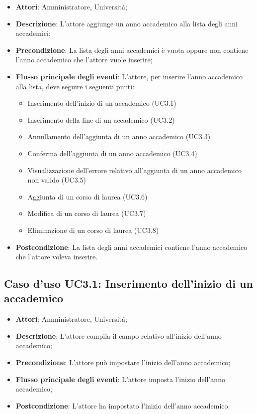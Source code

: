 \begin{itemize}
\item \textbf{Attori}: Amministratore, Università;
\item \textbf{Descrizione}: L'attore aggiunge un anno accademico alla lista degli anni accademici;
\item \textbf{Precondizione}: La lista degli anni accademici è vuota oppure non contiene l'anno accademico che l'attore vuole inserire;
\item \textbf{Flusso principale degli eventi}: L'attore, per inserire l'anno accademico alla lista, deve seguire i seguenti punti:
\begin{itemize}
\item Inserimento dell'inizio di un accademico (UC3.1)
\item Inserimento della fine di un accademico (UC3.2)
\item Annullamento dell'aggiunta di un anno accademico (UC3.3)
\item Conferma dell'aggiunta di un anno accademico (UC3.4)
\item Visualizzazione dell'errore relativo all'aggiunta di un anno accademico non valido (UC3.5)
\item Aggiunta di un corso di laurea (UC3.6)
\item Modifica di un corso di laurea (UC3.7)
\item Eliminazione di un corso di laurea (UC3.8)
\end{itemize}
\item \textbf{Postcondizione}: La lista degli anni accademici contiene l'anno accademico che l'attore voleva inserire.
\end{itemize}
\subsection{Caso d'uso \texorpdfstring{UC3.1}{UC3.1}: Inserimento dell'inizio di un accademico}
\begin{itemize}
\item \textbf{Attori}: Amministratore, Università;
\item \textbf{Descrizione}: L'attore compila il campo relativo all'inizio dell'anno accademico;
\item \textbf{Precondizione}: L'attore può impostare l'inizio dell'anno accademico;
\item \textbf{Flusso principale degli eventi}: L'attore imposta l'inizio dell'anno accademico;
\item \textbf{Postcondizione}: L'attore ha impostato l'inizio dell'anno accademico.
\end{itemize}
